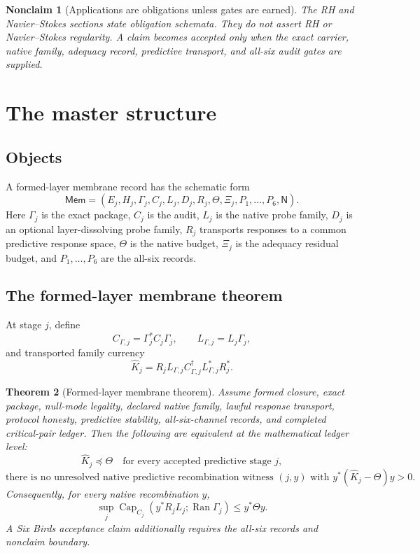 \documentclass[11pt]{article}
\newtheorem{theorem}{Theorem}[section]
\newtheorem{nonclaim}[theorem]{Nonclaim}
\DeclareMathOperator{\range}{Ran}
\DeclareMathOperator{\Capacity}{Cap}
\newcommand{\Loewner}{\preceq}
\begin{document}
\begin{nonclaim}[Applications are obligations unless gates are earned]
The RH and Navier--Stokes sections state obligation schemata.  They do not assert RH or Navier--Stokes regularity.  A claim becomes accepted only when the exact carrier, native family, adequacy record, predictive transport, and all-six audit gates are supplied.
\end{nonclaim}

\section{The master structure}

\subsection{Objects}
A formed-layer membrane record has the schematic form
\[
  \mathsf{Mem}=(E_j,H_j,\Gamma_j,C_j,L_j,D_j,R_j,\Theta,\Xi_j,P_1,\ldots,P_6,\mathsf N).
\]
Here \(\Gamma_j\) is the exact package, \(C_j\) is the audit, \(L_j\) is the native probe family, \(D_j\) is an optional layer-dissolving probe family, \(R_j\) transports responses to a common predictive response space, \(\Theta\) is the native budget, \(\Xi_j\) is the adequacy residual budget, and \(P_1,\ldots,P_6\) are the all-six records.

\subsection{The formed-layer membrane theorem}
At stage \(j\), define
\[
  C_{\Gamma,j}=\Gamma_j^*C_j\Gamma_j,
  \qquad
  L_{\Gamma,j}=L_j\Gamma_j,
\]
and transported family currency
\[
  \widehat K_j
  =R_jL_{\Gamma,j}C_{\Gamma,j}^\dagger L_{\Gamma,j}^*R_j^*.
\]

\begin{theorem}[Formed-layer membrane theorem]
Assume formed closure, exact package, null-mode legality, declared native family, lawful response transport, protocol honesty, predictive stability, all-six-channel records, and completed critical-pair ledger.  Then the following are equivalent at the mathematical ledger level:
\[
  \widehat K_j\Loewner\Theta\quad\text{for every accepted predictive stage }j,
\]
\[
  \text{there is no unresolved native predictive recombination witness }(j,y)
  \text{ with }y^*(\widehat K_j-\Theta)y>0.
\]
Consequently, for every native recombination \(y\),
\[
  \sup_j \Capacity_{C_j}(y^*R_jL_j;\range\Gamma_j)\le y^*\Theta y.
\]
A Six Birds acceptance claim additionally requires the all-six records and nonclaim boundary.
\end{theorem}
\end{document}
